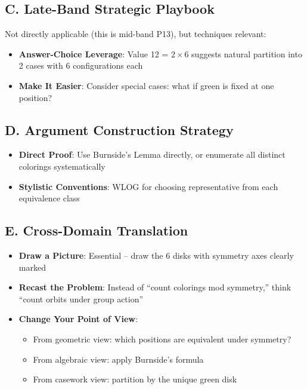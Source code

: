 \documentclass[11pt]{article}
\begin{document}
\begin{strategicbox}
\subsection*{C. Late-Band Strategic Playbook}
Not directly applicable (this is mid-band P13), but techniques relevant:
\begin{itemize}[leftmargin=*]
    \item \textbf{Answer-Choice Leverage}: Value 12 = $2 \times 6$ suggests natural partition into 2 cases with 6 configurations each
    \item \textbf{Make It Easier}: Consider special cases: what if green is fixed at one position?
\end{itemize}

\subsection*{D. Argument Construction Strategy}
\begin{itemize}[leftmargin=*]
    \item \textbf{Direct Proof}: Use Burnside's Lemma directly, or enumerate all distinct colorings systematically
    \item \textbf{Stylistic Conventions}: WLOG for choosing representative from each equivalence class
\end{itemize}

\subsection*{E. Cross-Domain Translation}
\begin{itemize}[leftmargin=*]
    \item \textbf{Draw a Picture}: Essential -- draw the 6 disks with symmetry axes clearly marked
    \item \textbf{Recast the Problem}: Instead of ``count colorings mod symmetry,'' think ``count orbits under group action''
    \item \textbf{Change Your Point of View}: 
    \begin{itemize}
        \item From geometric view: which positions are equivalent under symmetry?
        \item From algebraic view: apply Burnside's formula
        \item From casework view: partition by the unique green disk
    \end{itemize}
\end{itemize}
\end{strategicbox}
\end{document}
